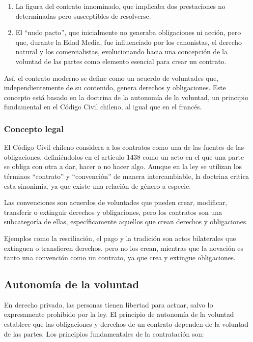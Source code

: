 \documentclass{templateNote}
\begin{document}
\begin{enumerate}
    \item La figura del contrato innominado, que implicaba dos prestaciones no determinadas pero susceptibles de resolverse.
    \item El ``nudo pacto'', que inicialmente no generaba obligaciones ni acción, pero que, durante la Edad Media, fue influenciado por los canonistas, el derecho natural y los comercialistas, evolucionando hacia una concepción de la voluntad de las partes como elemento esencial para crear un contrato.
\end{enumerate}

Así, el contrato moderno se define como un acuerdo de voluntades que, independientemente de su contenido, genera derechos y obligaciones. Este concepto está basado en la doctrina de la autonomía de la voluntad, un principio fundamental en el Código Civil chileno, al igual que en el francés.

\subsubsection{Concepto legal}
El Código Civil chileno considera a los contratos como una de las fuentes de las obligaciones, definiéndolos en el artículo 1438 como un acto en el que una parte se obliga con otra a dar, hacer o no hacer algo. Aunque en la ley se utilizan los términos ``contrato'' y ``convención'' de manera intercambiable, la doctrina critica esta sinonimia, ya que existe una relación de género a especie. 

Las convenciones son acuerdos de voluntades que pueden crear, modificar, transferir o extinguir derechos y obligaciones, pero los contratos son una subcategoría de ellas, específicamente aquellos que crean derechos y obligaciones. 

Ejemplos como la resciliación, el pago y la tradición son actos bilaterales que extinguen o transfieren derechos, pero no los crean, mientras que la novación es tanto una convención como un contrato, ya que crea y extingue obligaciones.

\subsection{Autonomía de la voluntad}
En derecho privado, las personas tienen libertad para actuar, salvo lo expresamente prohibido por la ley. El principio de autonomía de la voluntad establece que las obligaciones y derechos de un contrato dependen de la voluntad de las partes. Los principios fundamentales de la contratación son:
\end{document}
